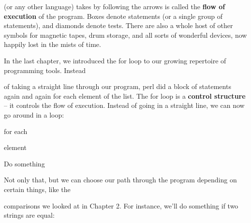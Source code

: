 \documentclass[a4paper,11pt]{book}
\begin{document}
\noindent (or any other language) takes by following the arrows is called the \textbf{flow of execution }of the program. Boxes denote statements (or a single group of statements), and diamonds denote tests. There are also a whole host of other symbols for magnetic tapes, drum storage, and all sorts of wonderful devices, now happily lost in the mists of time.

\noindent  

\noindent  

\noindent  

\noindent  

\noindent 

\noindent 

\noindent In the last chapter, we introduced the for  loop  to our growing repertoire of programming tools. Instead

\noindent of taking a straight line through our program, perl did a block of statements again and again for each element of the list. The for loop is a \textbf{control structure }-- it controls the flow of execution. Instead of going in a straight line, we can now go around in a loop:

\noindent 

\noindent 

\noindent 

\noindent for each

\noindent element

\noindent 

\noindent 

\noindent 

\noindent 

\noindent 

\noindent Do something

\noindent 

\noindent 

\noindent 

\noindent 

\noindent 

\noindent 

\noindent 

\noindent 

\noindent Not only that, but we can choose our path through the program depending on certain things, like the

\noindent comparisons we looked at in Chapter 2. For instance, we'll do something if two strings are equal:

\noindent 

\noindent 
\end{document}
